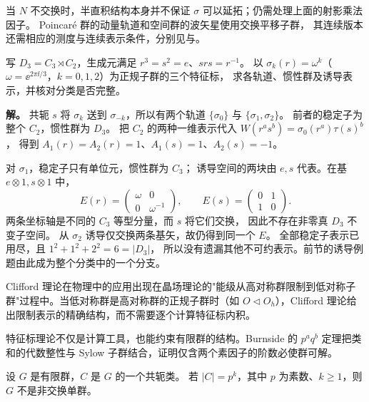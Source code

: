 当 $N$ 不交换时，半直积结构本身并不保证 $\sigma$ 可以延拓；仍需处理上面的射影乘法因子。
Poincar\'e 群的动量轨道和空间群的波矢星使用交换平移子群，
其连续版本还需相应的测度与连续表示条件，分别见与。

\begin{example}[$D_3$ 的全部表示由小群构造得到]
写 $D_3=C_3\rtimes C_2$，生成元满足 $r^3=s^2=e$、$srs=r^{-1}$。
以 $\sigma_k(r)=\omega^k$（$\omega=\ee^{2\pi\ii/3}$，$k=0,1,2$）为正规子群的三个特征标，
求各轨道、惯性群及诱导表示，并核对分类是否完整。

\textbf{解。} 共轭 $s$ 将 $\sigma_k$ 送到 $\sigma_{-k}$，所以有两个轨道
$\{\sigma_0\}$ 与 $\{\sigma_1,\sigma_2\}$。
前者的稳定子为整个 $C_2$，惯性群为 $D_3$。
把 $C_2$ 的两种一维表示代入 $W(r^as^b)=\sigma_0(r^a)\tau(s)^b$，
得到 $A_1(r)=A_2(r)=1$、$A_1(s)=1$、$A_2(s)=-1$。

对 $\sigma_1$，稳定子只有单位元，惯性群为 $C_3$；
诱导空间的两块由 $e,s$ 代表。在基 $e\otimes1,s\otimes1$ 中，
\[
E(r)=\begin{pmatrix}\omega&0\\0&\omega^{-1}\end{pmatrix},\qquad
E(s)=\begin{pmatrix}0&1\\1&0\end{pmatrix}.
\]
两条坐标轴是不同的 $C_3$ 等型分量，而 $s$ 将它们交换，
因此不存在非零真 $D_3$ 不变子空间。
从 $\sigma_2$ 诱导仅交换两条基矢，故仍得到同一个 $E$。
全部稳定子表示已用尽，且 $1^2+1^2+2^2=6=|D_3|$，
所以没有遗漏其他不可约表示。前节的诱导例题由此成为整个分类中的一个分支。
\end{example}

Clifford 理论在物理中的应用出现在晶场理论的"能级从高对称群限制到低对称子群"过程中。当低对称群是高对称群的正规子群时（如 $O\triangleleft O_h$），Clifford 理论给出限制表示的精确结构，而不需要逐个计算特征标内积。


特征标理论不仅是计算工具，也能约束有限群的结构。Burnside 的 $p^aq^b$ 定理把类和的代数整性与 Sylow 子群结合，证明仅含两个素因子的阶数必使群可解。

\begin{lemma}
\label{lem:burnside-class}
设 $G$ 是有限群，$C$ 是 $G$ 的一个共轭类。
若 $|C|=p^k$，其中 $p$ 为素数、$k\ge1$，则 $G$ 不是非交换单群。
\end{lemma}


